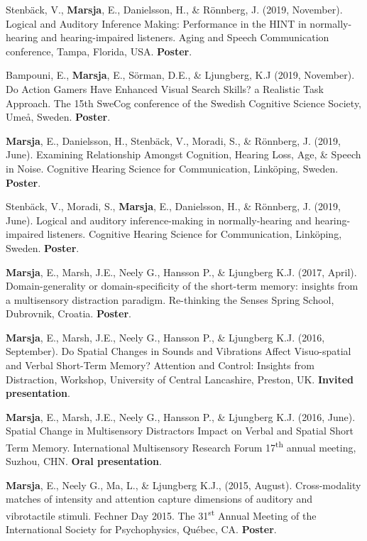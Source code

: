 \documentclass[]{article}
\begin{document}
Stenbäck, V., \textbf{Marsja}, E., Danielsson, H., \& Rönnberg, J.
(2019, November). Logical and Auditory Inference Making: Performance in
the HINT in normally-hearing and hearing-impaired listeners. Aging and
Speech Communication conference, Tampa, Florida, USA. \textbf{Poster}.

Bampouni, E., \textbf{Marsja}, E., Sörman, D.E., \& Ljungberg, K.J
(2019, November). Do Action Gamers Have Enhanced Visual Search Skills? a
Realistic Task Approach. The 15th SweCog conference of the Swedish
Cognitive Science Society, Umeå, Sweden. \textbf{Poster}.

\textbf{Marsja}, E., Danielsson, H., Stenbäck, V., Moradi, S., \&
Rönnberg, J. (2019, June). Examining Relationship Amongst Cognition,
Hearing Loss, Age, \& Speech in Noise. Cognitive Hearing Science for
Communication, Linköping, Sweden. \textbf{Poster}.

Stenbäck, V., Moradi, S., \textbf{Marsja}, E., Danielsson, H., \&
Rönnberg, J. (2019, June). Logical and auditory inference-making in
normally-hearing and hearing-impaired listeners. Cognitive Hearing
Science for Communication, Linköping, Sweden. \textbf{Poster}.

\textbf{Marsja}, E., Marsh, J.E., Neely G., Hansson P., \& Ljungberg
K.J. (2017, April). Domain-generality or domain-specificity of the
short-term memory: insights from a multisensory distraction paradigm.
Re-thinking the Senses Spring School, Dubrovnik, Croatia.
\textbf{Poster}.

\textbf{Marsja}, E., Marsh, J.E., Neely G., Hansson P., \& Ljungberg
K.J. (2016, September). Do Spatial Changes in Sounds and Vibrations
Affect Visuo-spatial and Verbal Short-Term Memory? Attention and
Control: Insights from Distraction, Workshop, University of Central
Lancashire, Preston, UK. \textbf{Invited presentation}.

\textbf{Marsja}, E., Marsh, J.E., Neely G., Hansson P., \& Ljungberg
K.J. (2016, June). Spatial Change in Multisensory Distractors Impact on
Verbal and Spatial Short Term Memory. International Multisensory
Research Forum 17\textsuperscript{th} annual meeting, Suzhou, CHN.
\textbf{Oral presentation}.

\textbf{Marsja}, E., Neely G., Ma, L., \& Ljungberg K.J., (2015,
August). Cross-modality matches of intensity and attention capture
dimensions of auditory and vibrotactile stimuli. Fechner Day 2015. The
31\textsuperscript{st} Annual Meeting of the International Society for
Psychophysics, Québec, CA. \textbf{Poster}.
\end{document}
